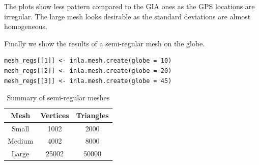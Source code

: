 \documentclass[a4paper,12pt]{article}
\begin{document}
The plots show less pattern compared to the GIA ones as the GPS locations are irregular. The large mesh looks desirable as the standard deviations are almost homogeneous.

Finally we show the results of a semi-regular mesh on the globe.
\begin{verbatim}
mesh_regs[[1]] <- inla.mesh.create(globe = 10)
mesh_regs[[2]] <- inla.mesh.create(globe = 20)
mesh_regs[[3]] <- inla.mesh.create(globe = 45)
\end{verbatim}

\begin{table}[htbp] 
\centering
\caption{Summary of semi-regular meshes}\label{tab:reg_mesh}
\begin{tabular}{ c| c c }
\hline
 Mesh     & Vertices & Triangles \\\hline
 Small  &  1002 & 2000 \\ 
 Medium &  4002 & 8000 \\  
 Large  & 25002 & 50000 \\   \hline
\end{tabular}
\end{table}
\end{document}

